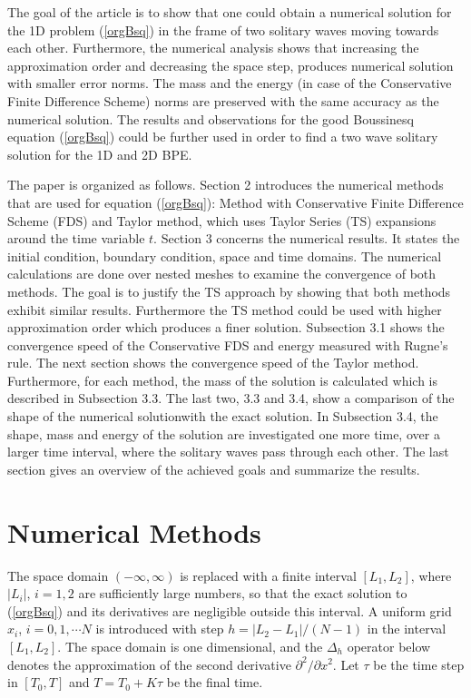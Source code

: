 \documentclass[%
 aip,
cp,  
 amsmath,amssymb,
 reprint,
]{iopconfser}
\newcommand{\rf}[1]{(\ref{#1})}
\begin{document}
The goal of the article is to show that one could obtain a numerical solution for the 1D problem \rf{orgBsq} in the frame of two solitary waves moving towards each other. Furthermore, the numerical analysis shows that increasing the approximation order and decreasing the space step, produces  numerical solution with smaller error norms. The mass and the energy (in case of the Conservative Finite Difference Scheme) norms are preserved with the same accuracy as the numerical solution. The results and observations for the good Boussinesq equation \rf{orgBsq} could be further used in order to find a two wave solitary solution for the 1D and 2D BPE.

The paper is organized as follows. Section 2 introduces the numerical methods that are used for equation \rf{orgBsq}: Method with Conservative Finite Difference Scheme (FDS) and Taylor method, which uses Taylor Series (TS) expansions around the time variable $t$. Section 3 concerns the numerical results. It states the initial condition, boundary condition, space and time domains. The numerical calculations are done over nested meshes to examine the convergence of both methods. The goal is to justify the TS approach by showing that both methods exhibit similar results. Furthermore the TS method could be used with higher approximation order which produces a finer solution. Subsection 3.1 shows the convergence speed of the Conservative FDS and energy measured with Rugne's rule. The next section shows the convergence speed of the Taylor method. Furthermore, for each method, the mass of the solution is calculated which is described in Subsection 3.3. The last two, 3.3 and 3.4, show a comparison of the shape of the numerical solutionwith the exact solution. In Subsection 3.4, the shape, mass and energy of the solution are investigated one more time, over a larger time interval, where the solitary waves pass through each other. The last section gives an overview of the achieved goals and summarize the results.

\section{Numerical Methods}

The space domain $(-\infty,\infty)$ is replaced with a finite  interval $[L_1,L_2]$, where $|L_i|$, $i=1,2$ are sufficiently large numbers, so that the exact solution to \rf{orgBsq} and its derivatives are negligible outside this interval. A uniform grid $x_i$,  $i=0,1,\cdots N$ is introduced with step $h=|L_2-L_1|/(N-1)$ in the interval $[L_1,L_2]$. The space domain is one dimensional, and the $\Delta_h$ operator below denotes the approximation of the second derivative $\partial^2/\partial x^2$.
Let $\tau$ be the time step in $[T_0,T]$ and $T=T_0+K \tau$ be the final time. 
\end{document}
